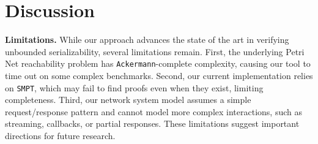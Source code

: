 

\section{Discussion}
\label{sec:discussion}



%




\textbf{Limitations.}
While our approach advances the state of the art in verifying unbounded serializability, several limitations remain.
First, the underlying Petri Net reachability problem has \texttt{Ackermann}-complete complexity, causing our tool to time out on some complex benchmarks. %
Second, our current implementation relies on \texttt{SMPT}, which may fail to find proofs even when they exist, limiting completeness.
Third, our network system model assumes a simple request/response pattern and cannot model more complex interactions, such as streaming, callbacks, or partial responses.
These limitations suggest important directions for future research.

